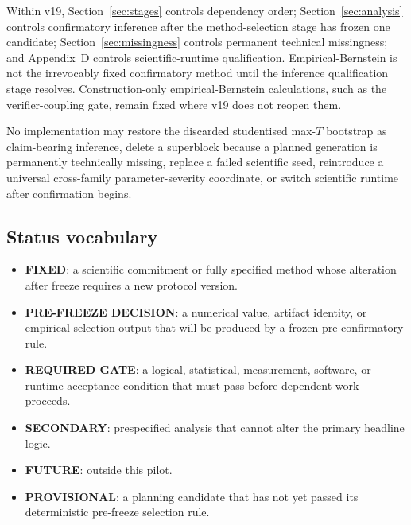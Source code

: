 \documentclass[11pt,a4paper]{article}
\newcommand{\FIXED}{\textbf{FIXED}}
\newcommand{\PROV}{\textbf{PROVISIONAL}}
\newcommand{\PFD}{\textbf{PRE-FREEZE DECISION}}
\newcommand{\GATE}{\textbf{REQUIRED GATE}}
\newcommand{\SECONDARY}{\textbf{SECONDARY}}
\newcommand{\FUTURE}{\textbf{FUTURE}}
\begin{document}
Within v19, Section~\ref{sec:stages} controls dependency order; Section~\ref{sec:analysis} controls confirmatory inference after the method-selection stage has frozen one candidate; Section~\ref{sec:missingness} controls permanent technical missingness; and Appendix~D controls scientific-runtime qualification. Empirical-Bernstein is not the irrevocably fixed confirmatory method until the inference qualification stage resolves. Construction-only empirical-Bernstein calculations, such as the verifier-coupling gate, remain fixed where v19 does not reopen them.

No implementation may restore the discarded studentised max-$T$ bootstrap as claim-bearing inference, delete a superblock because a planned generation is permanently technically missing, replace a failed scientific seed, reintroduce a universal cross-family parameter-severity coordinate, or switch scientific runtime after confirmation begins.

\subsection{Status vocabulary}
\begin{itemize}
\item \FIXED{}: a scientific commitment or fully specified method whose alteration after freeze requires a new protocol version.
\item \PFD{}: a numerical value, artifact identity, or empirical selection output that will be produced by a frozen pre-confirmatory rule.
\item \GATE{}: a logical, statistical, measurement, software, or runtime acceptance condition that must pass before dependent work proceeds.
\item \SECONDARY{}: prespecified analysis that cannot alter the primary headline logic.
\item \FUTURE{}: outside this pilot.
\item \PROV{}: a planning candidate that has not yet passed its deterministic pre-freeze selection rule.
\end{itemize}
\end{document}
